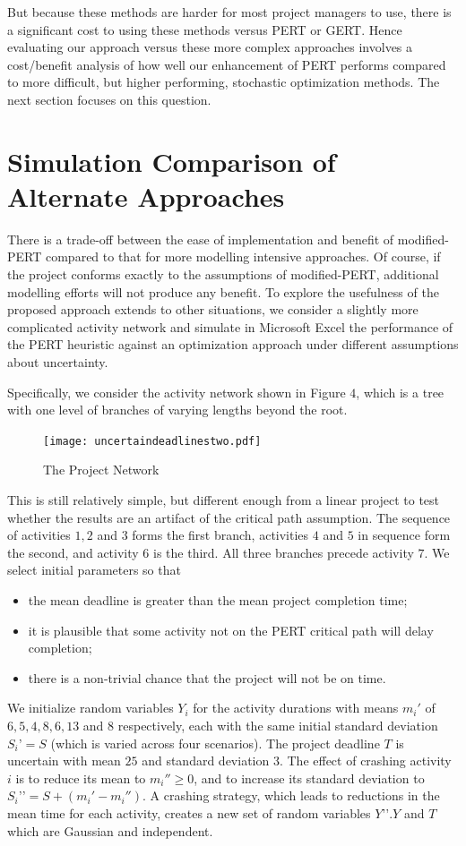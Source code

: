 \documentclass[11pt]{article}
\begin{document}
But because these methods are harder for most project managers to use,  there is a significant cost to using these methods versus PERT or GERT.  Hence evaluating our approach versus these more complex approaches involves a cost/benefit analysis of how well our enhancement of PERT performs compared to more difficult, but higher performing, stochastic optimization methods.  The next section focuses on this question. 
\section{Simulation Comparison of Alternate Approaches}
There is a trade-off between the ease of implementation and benefit of modified-PERT compared to that for more modelling intensive approaches. Of course, if the project conforms exactly to the assumptions of modified-PERT, additional modelling efforts will not produce any benefit. To explore the usefulness of the proposed approach extends to other situations, we consider a slightly more complicated activity network and simulate in Microsoft Excel the performance of the PERT heuristic against an optimization approach under different assumptions about uncertainty.  \par
Specifically, we consider the activity network shown in Figure $4$, which is a tree with one level of branches of varying lengths beyond the root.
\begin{figure}[h]
\begin{center}
\texttt{[image: uncertaindeadlinestwo.pdf]}
\caption{The Project Network}
\label{fixXscaled}
\end{center}
\end{figure}
 This is still relatively simple, but different enough from a linear project to test whether the results are an artifact of the critical path assumption. The sequence of activities $1, 2$ and $3$ forms the first branch, activities $4$ and $5$ in sequence form the second, and activity $6$ is the third. All three branches precede activity $7$. We select initial parameters so that
\begin{itemize} \item the mean deadline is greater than the mean project completion time;
\item it is plausible that some activity not on the PERT critical path will delay completion; 
\item there is a non-trivial chance that the project will not be on time. 
\end{itemize}
We initialize random variables $Y_i$ for the activity durations with means $m_i'$  of $6, 5, 4, 8, 6, 13$ and $8$ respectively, each with the same initial standard deviation $S_i’ = S$ (which is varied across four scenarios). The project deadline $T$ is uncertain with mean $25$ and standard deviation $3$.  The effect of crashing activity $i$ is to reduce its mean to $m_i'' \geq 0$, and to increase its standard deviation to $S_i’’ = S + (m_i'-m_i'')$. A crashing strategy, which leads to reductions in the mean time for each activity, creates a new set of random variables $Y’’. Y$ and $T$ which are Gaussian and independent.
\end{document}
